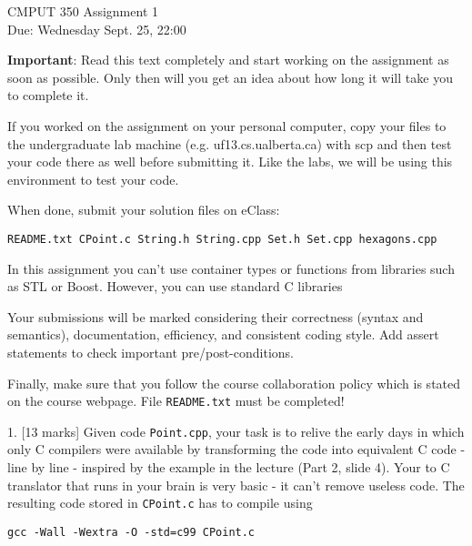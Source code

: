 \documentclass[a4paper,11pt]{article}
\begin{document}

\begin{center}
{\Large CMPUT 350 Assignment 1} \\
{Due: Wednesday Sept. 25, 22:00}
\end{center}

\linerule

\textbf{Important}:
Read this text completely and start working on the assignment as
soon as possible. Only then will you get an idea about how long it will take
you to complete it. 

\medskip

If you worked on the assignment on your personal computer, copy your files to
the undergraduate lab machine (e.g. uf13.cs.ualberta.ca) with
scp and then test your code there as well before submitting it. 
Like the labs, we will be using this environment to test your code.

\medskip

When done, submit your solution files on eClass:

\begin{center}
    \texttt{README.txt CPoint.c String.h String.cpp Set.h Set.cpp hexagons.cpp}
\end{center}


\bigskip 

In this assignment you can't use {\CC} container types or functions from {\CC}
libraries such as STL or Boost. However, you can use standard C libraries

\medskip

Your submissions will be marked considering their correctness (syntax and
semantics), documentation, efficiency, and consistent coding style. Add assert
statements to check important pre/post-conditions.

\medskip

Finally, make sure that you follow the course collaboration policy which is
stated on the course webpage. File \texttt{README.txt} must be completed!

\linerule

1. [13 marks] 
Given {\CC} code \texttt{Point.cpp}, your task is to relive the early {\CC}
days in which only C compilers were available by transforming the {\CC} code
into equivalent C code - line by line - inspired by the example in the lecture
(Part 2, slide 4). Your {\CC} to C translator that runs in your brain is very
basic - it can't remove useless code. The resulting code stored in \texttt{CPoint.c}
has to compile using
\begin{center}
    \texttt{gcc -Wall -Wextra -O -std=c99 CPoint.c}
\end{center}
\end{document}
